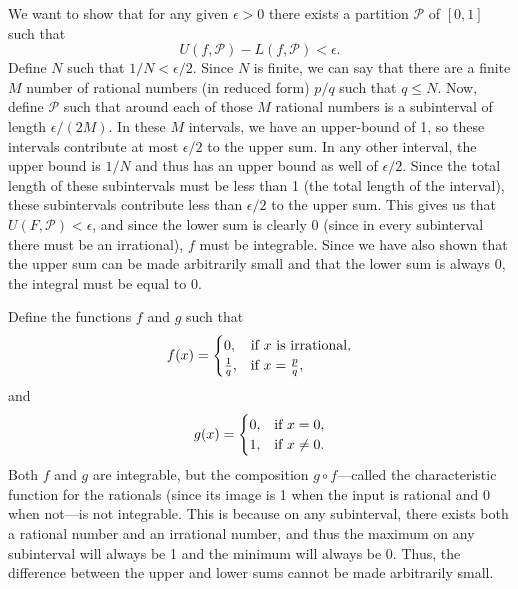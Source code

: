 \begin{problem}[13-35]
We want to show that for any given $\epsilon > 0$ there exists a partition $\mathscr{P}$ of $[0, 1]$ such that 
\[ U(f, \mathscr{P}) - L(f, \mathscr{P}) < \epsilon. \]
Define $N$ such that $1/N < \epsilon / 2$. Since $N$ is finite, we can say that there are a finite $M$ number of rational numbers (in reduced form) $p/q$ such that $q \le N$. Now, define $\mathscr{P}$ such that around each of those $M$ rational numbers is a subinterval of length $\epsilon / (2M)$. In these $M$ intervals, we have an upper-bound of 1, so these intervals contribute at most $\epsilon / 2$ to the upper sum. In any other interval, the upper bound is $1/N$ and thus has an upper bound as well of $\epsilon / 2$. Since the total length of these subintervals must be less than 1 (the total length of the interval), these subintervals contribute less than $\epsilon / 2$ to the upper sum. This gives us that $U(F, \mathscr{P}) < \epsilon$, and since the lower sum is clearly 0 (since in every subinterval there must be an irrational), $f$ must be integrable. Since we have also shown that the upper sum can be made arbitrarily small and that the lower sum is always 0, the integral must be equal to 0.
\end{problem}

\begin{problem}[13-36]
Define the functions $f$ and $g$ such that
\[ f(x)=\begin{cases} 0,&\rmif\ x\textrm{ is irrational,} \\ \frac 1q, &\rmif\ x = \frac pq, \end{cases} \]
and 
\[ g(x)=\begin{cases} 0,&\textrm{if}\ x = 0, \\ 1, &\textrm{if}\ x \ne 0. \end{cases} \]
Both $f$ and $g$ are integrable, but the composition $g \circ f$---called the characteristic function for the rationals (since its image is 1 when the input is rational and 0 when not---is not integrable. This is because on any subinterval, there exists both a rational number and an irrational number, and thus the maximum on any subinterval will always be 1 and the minimum will always be 0. Thus, the difference between the upper and lower sums cannot be made arbitrarily small. 
\end{problem}